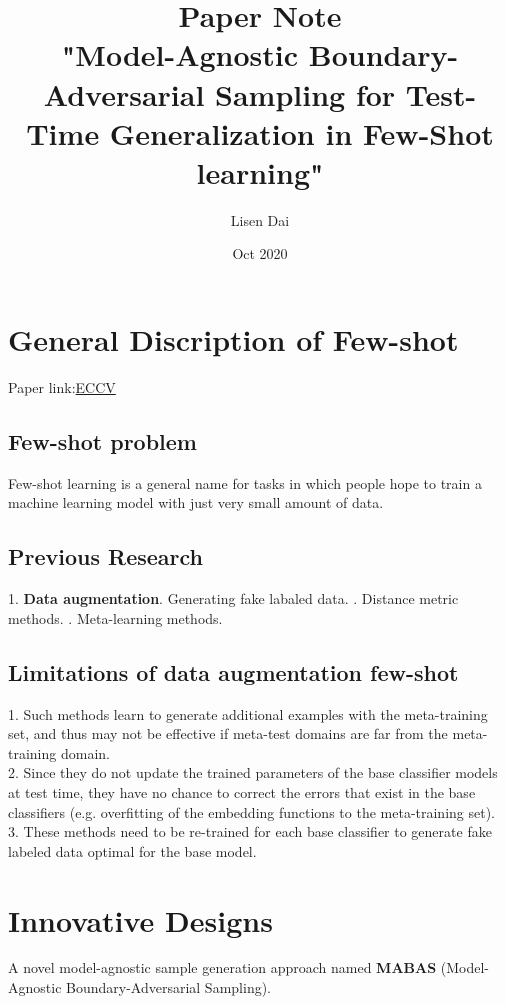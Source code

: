 \documentclass{article}
\title{
    {Paper Note}\\
    {\large "Model-Agnostic Boundary-Adversarial Sampling for Test-Time Generalization in Few-Shot learning"}
}
\author{Lisen Dai}
\date{Oct 2020}
\begin{document}
\maketitle

\section{General Discription of Few-shot}
Paper link:\href{https://www.ecva.net/papers/eccv_2020/papers_ECCV/papers/123460579.pdf}{ECCV}
\subsection{Few-shot problem}
Few-shot learning is a general name for tasks in which people hope
to train a machine learning model with just very small amount of data. \newline

\subsection{Previous Research}
1. \textbf{Data augmentation}. Generating fake labaled data. . Distance metric methods. . Meta-learning methods. \newline

\subsection{Limitations of data augmentation few-shot}
1. Such methods learn to generate additional examples with the 
meta-training set, and thus may not be effective if meta-test domains are far from the meta-training domain. \\
2. Since they do not update the trained parameters of the base 
classifier models at test time, they have no chance to correct the 
errors that exist in the base classifiers (e.g. overfitting of the embedding functions to the meta-training set). \\
3. These methods need to be re-trained for each base classifier 
to generate fake labeled data optimal for the base model. \\

\section{Innovative Designs}
A novel model-agnostic sample generation approach named \textbf{MABAS} (Model-Agnostic Boundary-Adversarial Sampling). \\
\end{document}
